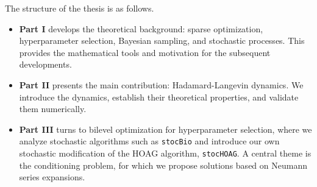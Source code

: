 \documentclass[11pt, twoside]{report}
\begin{document}
The structure of the thesis is as follows.
\begin{itemize}
    \item \textbf{Part I} develops the theoretical background: sparse optimization, hyperparameter selection, Bayesian sampling, and stochastic processes. This provides the mathematical tools and motivation for the subsequent developments.
    \item \textbf{Part II} presents the main contribution: Hadamard-Langevin dynamics. We introduce the dynamics, establish their theoretical properties, and validate them numerically.
    \item \textbf{Part III} turns to bilevel optimization for hyperparameter selection,
    where we analyze stochastic algorithms such as \texttt{stocBio} and introduce our own stochastic modification of the HOAG algorithm, \texttt{stocHOAG}. A central theme is the
    conditioning problem, for which we propose solutions based on Neumann series expansions.
\end{itemize}
\end{document}
